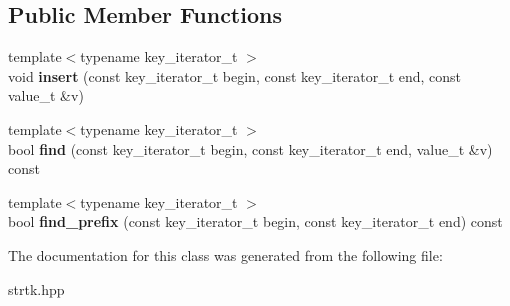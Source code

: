\subsection*{Public Member Functions}
\begin{DoxyCompactItemize}
\item 
\hypertarget{classstrtk_1_1trie_1_1prefix_a14ec25433dff5812a0a7f5856697c15c}{{\footnotesize template$<$typename key\-\_\-iterator\-\_\-t $>$ }\\void {\bfseries insert} (const key\-\_\-iterator\-\_\-t begin, const key\-\_\-iterator\-\_\-t end, const value\-\_\-t \&v)}\label{classstrtk_1_1trie_1_1prefix_a14ec25433dff5812a0a7f5856697c15c}

\item 
\hypertarget{classstrtk_1_1trie_1_1prefix_a2bef2459f617c0b59515cd74525019e8}{{\footnotesize template$<$typename key\-\_\-iterator\-\_\-t $>$ }\\bool {\bfseries find} (const key\-\_\-iterator\-\_\-t begin, const key\-\_\-iterator\-\_\-t end, value\-\_\-t \&v) const }\label{classstrtk_1_1trie_1_1prefix_a2bef2459f617c0b59515cd74525019e8}

\item 
\hypertarget{classstrtk_1_1trie_1_1prefix_ae3c282734d52ea54198d4a38a07926fa}{{\footnotesize template$<$typename key\-\_\-iterator\-\_\-t $>$ }\\bool {\bfseries find\-\_\-prefix} (const key\-\_\-iterator\-\_\-t begin, const key\-\_\-iterator\-\_\-t end) const }\label{classstrtk_1_1trie_1_1prefix_ae3c282734d52ea54198d4a38a07926fa}

\end{DoxyCompactItemize}


The documentation for this class was generated from the following file\-:\begin{DoxyCompactItemize}
\item 
strtk.\-hpp\end{DoxyCompactItemize}
